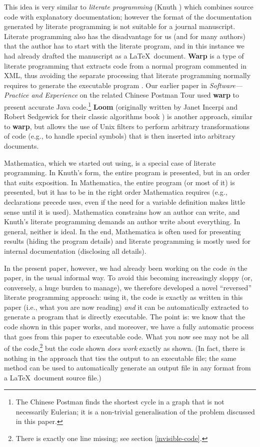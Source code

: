 \documentclass[12pt]{article}
\def\name#1{\textbf{#1}}
\begin{document}
This idea is very similar to \emph{literate programming} (Knuth \cite{litprog}) which combines source code with explanatory documentation; however the format of the documentation generated by literate programming is not suitable for a journal manuscript. Literate programming also has the disadvantage for us (and for many authors) that the author has to start with the literate program, and in this instance we had already drafted the manuscript as a \LaTeX\ document. \name{Warp\/} is a type of literate programming that extracts code from a normal program commented in XML, thus avoiding the separate processing that literate programming normally requires to generate the executable program \cite{warp}. Our earlier paper in \emph{Software---Practice and Experience\/} on the related Chinese Postman Tour \cite{cpp} used \name{warp\/} to present accurate Java code.\footnote{The Chinese Postman finds the shortest cycle in a graph that is not necessarily Eulerian; it is a non-trivial generalisation of the problem discussed in this paper.} \name{Loom\/} \cite{loom} (originally written by Janet Incerpi and Robert Sedgewick for their classic algorithms book \cite{sedgeoriginalbook}) is another approach, similar to \name{warp\/}, but allows the use of Unix filters to perform arbitrary transformations of code (e.g., to handle special symbols) that is then inserted into arbitrary documents. 

Mathematica, which we started out using, is a special case of literate programming. In Knuth's form, the entire program is presented, but in an order that suits exposition. In Mathematica, the entire program (or most of it) is presented, but it has to be in the right order Mathematica requires (e.g., declarations precede uses, even if the need for a variable definition makes little sense until it is used). Mathematica constrains how an author can write, and Knuth's literate programming demands an author write about everything. In general, neither is ideal. In the end, Mathematica is often used for presenting results (hiding the program details) and literate programming is mostly used for internal documentation (disclosing all details).

In the present paper, however, we had already been working on the code \emph{in\/} the paper, in the usual informal way. To avoid this becoming increasingly sloppy (or, conversely, a huge burden to manage), we therefore developed a novel ``reversed'' literate programming approach: using it, the code is exactly as written in this paper (i.e., what you are now reading) \emph{and\/} it can be automatically extracted to generate a program that is directly executable. The point is: we know that the code shown in this paper works, and moreover, we have a fully automatic process that goes from this paper to executable code. What you now see may not be all of the code,\footnote{There is exactly one line missing; see section \ref{invisible-code}.} but the code shown \emph{does work\/} exactly as shown. (In fact, there is nothing in the approach that ties the output to an executable file; the same method can be used to automatically generate an output file in any format from a \LaTeX\ document source file.) 
\end{document}
